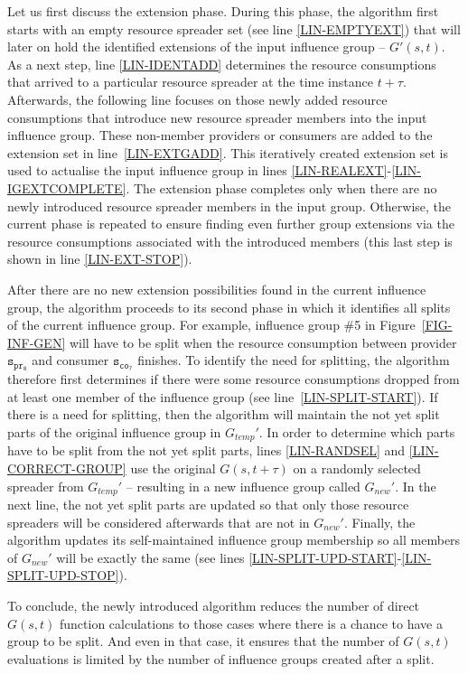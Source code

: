 \documentclass[sort, compress, 5p]{elsarticle}
\newcommand{\SMALLESTIMEGRANULARITYM}{\tau}
\begin{document}
Let us first discuss the extension phase. During this phase, the algorithm first starts with an empty resource spreader set (see line \ref{LIN-EMPTYEXT}) that will later on hold the identified extensions of the input influence group -- $G'(s,t)$. As a next step, line \ref{LIN-IDENTADD} determines the resource consumptions that arrived to a particular resource spreader at the time instance $t+\SMALLESTIMEGRANULARITYM$. Afterwards, the following line focuses on those newly added resource consumptions that introduce new resource spreader members into the input influence group. These non-member providers or consumers are added to the extension set in line~\ref{LIN-EXTGADD}. This iteratively created extension set is used to actualise the input influence group in lines \ref{LIN-REALEXT}-\ref{LIN-IGEXTCOMPLETE}. The extension phase completes only when there are no newly introduced resource spreader members in the input group. Otherwise, the current phase is repeated to ensure finding even further group extensions via the resource consumptions associated with the introduced members (this last step is shown in line \ref{LIN-EXT-STOP}).

After there are no new extension possibilities found in the current influence group, the algorithm proceeds to its second phase in which it identifies all splits of the current influence group. For example, influence group \#5 in Figure~\ref{FIG-INF-GEN} will have to be split when the resource consumption between provider $\mathtt{s_{pr_8}}$ and consumer $\mathtt{s_{co_7}}$ finishes. To identify the need for splitting, the algorithm therefore first determines if there were some resource consumptions dropped from at least one member of the influence group (see line~\ref{LIN-SPLIT-START}). If there is a need for splitting, then the algorithm will maintain the not yet split parts of the original influence group in $G_{temp}'$. In order to determine which parts have to be split from the not yet split parts, lines \ref{LIN-RANDSEL} and \ref{LIN-CORRECT-GROUP} use the original $G(s,t+\SMALLESTIMEGRANULARITYM)$ on a randomly selected spreader from $G_{temp}'$ -- resulting in a new influence group called $G_{new}'$. In the next line, the not yet split parts are updated so that only those resource spreaders will be considered afterwards that are not in $G_{new}'$. Finally, the algorithm updates its self-maintained influence group membership so all members of $G_{new}'$ will be exactly the same (see lines \ref{LIN-SPLIT-UPD-START}-\ref{LIN-SPLIT-UPD-STOP}).

To conclude, the newly introduced algorithm reduces the number of direct $G(s,t)$ function calculations to those cases where there is a chance to have a group to be split. And even in that case, it ensures that the number of $G(s,t)$ evaluations is limited by the number of influence groups created after a split.
\end{document}
